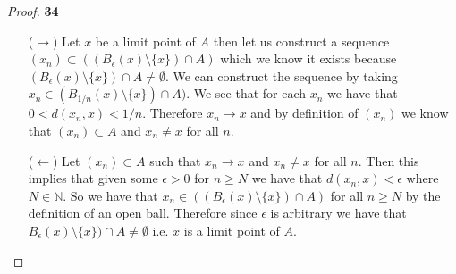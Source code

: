 \documentclass[11pt]{article}
\newcommand{\N}{\mathbb{N}}
\theoremstyle{definition}
\begin{document}
\cleardoublepage
    \begin{proof}{\textbf{34}}
        \begin{itemize}
        \item [($\rightarrow$)] Let $x$ be a limit point of $A$ then let us
        construct a sequence $(x_n) \subset ((B_\epsilon(x) \setminus \{x\}) \cap A)$
        which we know it exists because 
        $(B_\epsilon(x) \setminus \{x\}) \cap A \neq \emptyset$. We can
        construct the sequence by taking
        $x_n \in (B_{1/n}(x) \setminus \{x\}) \cap A)$.
        We see that for each $x_n$ we have that $0 < d(x_n, x) < 1/n$.
        Therefore $x_n \to x$ and by definition of $(x_n)$ we know that
        $(x_n) \subset A$ and $x_n \neq x$ for all $n$.
        \item [($\leftarrow$)] Let $(x_n) \subset A$ such that $x_n \to x$ and
        $x_n \neq x$ for all $n$. Then this implies that given some $\epsilon > 0$
        for $n \geq N$ we have that $d(x_n,x) < \epsilon$ where $N \in \N$.
        So we have that $x_n \in ((B_\epsilon(x) \setminus \{x\}) \cap A)$
        for all $n \geq N$ by the definition of an open ball. Therefore since
        $\epsilon$ is arbitrary we have that
        $B_\epsilon(x) \setminus \{x\}) \cap A \neq \emptyset$ i.e. $x$ is a
        limit point of $A$.
        \end{itemize}
    \end{proof}
\end{document}
